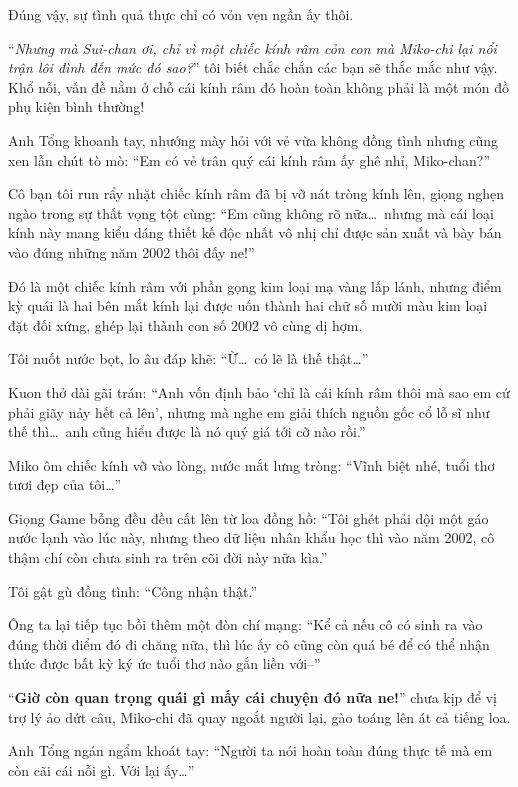 \documentclass[../main.tex]{subfiles}
\begin{document}

Đúng vậy, sự tình quả thực chỉ có vỏn vẹn ngần ấy thôi.

``\textit{Nhưng mà Sui-chan ơi, chỉ vì một chiếc kính râm cỏn con mà Miko-chi lại nổi trận lôi đình đến mức đó sao?}'' tôi biết chắc chắn các bạn sẽ thắc mắc như vậy. Khổ nỗi, vấn đề nằm ở chỗ cái kính râm đó hoàn toàn không phải là một món đồ phụ kiện bình thường!

Anh Tổng khoanh tay, nhướng mày hỏi với vẻ vừa không đồng tình nhưng cũng xen lẫn chút tò mò: ``Em có vẻ trân quý cái kính râm ấy ghê nhỉ, Miko-chan?''

Cô bạn tôi run rẩy nhặt chiếc kính râm đã bị vỡ nát tròng kính lên, giọng nghẹn ngào trong sự thất vọng tột cùng: ``Em cũng không rõ nữa\dots\ nhưng mà cái loại kính này mang kiểu dáng thiết kế độc nhất vô nhị chỉ được sản xuất và bày bán vào đúng những năm 2002 thôi đấy ne!''


Đó là một chiếc kính râm với phần gọng kim loại mạ vàng lấp lánh, nhưng điểm kỳ quái là hai bên mắt kính lại được uốn thành hai chữ số mười màu kim loại đặt đối xứng, ghép lại thành con số 2002 vô cùng dị hợm.

Tôi nuốt nước bọt, lo âu đáp khẽ: ``Ừ\dots\ có lẽ là thế thật\dots''

Kuon thở dài gãi trán: ``Anh vốn định bảo `chỉ là cái kính râm thôi mà sao em cứ phải giãy nảy hết cả lên', nhưng mà nghe em giải thích nguồn gốc cổ lỗ sĩ như thế thì\dots\ anh cũng hiểu được là nó quý giá tới cỡ nào rồi.''

Miko ôm chiếc kính vỡ vào lòng, nước mắt lưng tròng: ``Vĩnh biệt nhé, tuổi thơ tươi đẹp của tôi\dots''

Giọng Game bỗng đều đều cất lên từ loa đồng hồ: ``Tôi ghét phải dội một gáo nước lạnh vào lúc này, nhưng theo dữ liệu nhân khẩu học thì vào năm 2002, cô thậm chí còn chưa sinh ra trên cõi đời này nữa kìa.''

Tôi gật gù đồng tình: ``Công nhận thật.''

Ông ta lại tiếp tục bồi thêm một đòn chí mạng: ``Kể cả nếu cô có sinh ra vào đúng thời điểm đó đi chăng nữa, thì lúc ấy cô cũng còn quá bé để có thể nhận thức được bất kỳ ký ức tuổi thơ nào gắn liền với--''

``\textbf{Giờ còn quan trọng quái gì mấy cái chuyện đó nữa ne!}'' chưa kịp để vị trợ lý ảo dứt câu, Miko-chi đã quay ngoắt người lại, gào toáng lên át cả tiếng loa.

Anh Tổng ngán ngẩm khoát tay: ``Người ta nói hoàn toàn đúng thực tế mà em còn cãi cái nỗi gì. Với lại ấy\dots''
\end{document}

